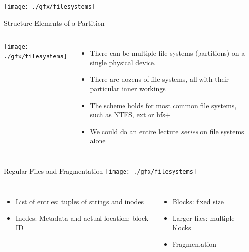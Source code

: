 
\begin{frame}
%
\begin{center}
	\texttt{[image: ./gfx/filesystems]}
\end{center}
%
\end{frame}


\begin{frame}{Structure Elements of a Partition}
%
\begin{columns}
	\texttt{[image: ./gfx/filesystems]}
%
	\small
	\begin{itemize}
	\item There can be multiple file systems (partitions) on a single physical device.
	\item There are dozens of file systems, all with their particular inner workings
	\item The scheme holds for most common file systems, such as NTFS, ext or hfs+
	\item We could do an entire lecture \emph{series} on file systems alone
	\end{itemize}
\end{columns}
%
\end{frame}


\begin{frame}{Regular Files and Fragmentation}
%
\texttt{[image: ./gfx/filesystems]}
%
\begin{columns}
	\begin{itemize}
	\item List of entries: tuples of strings and inodes
	\item Inodes: Metadata and actual location: block ID
	\end{itemize}
%
	\begin{itemize}
	\item Blocks: fixed size
	\item Larger files: multiple blocks
	\item[\Thus] Fragmentation
	\end{itemize}
\end{columns}
%
\end{frame}

